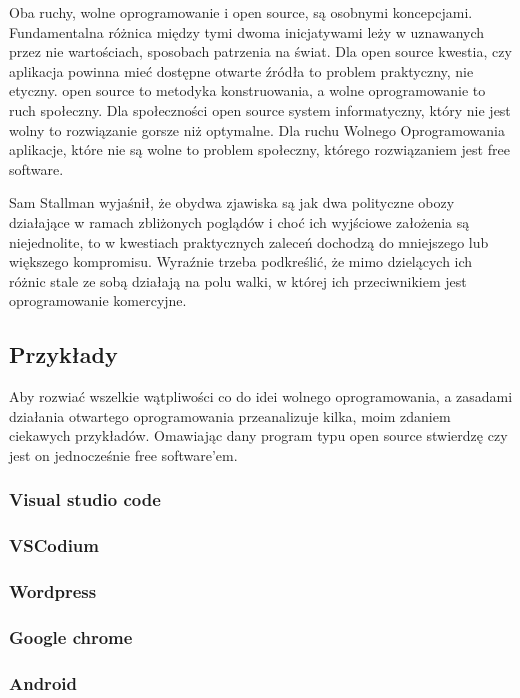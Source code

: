 \documentclass{article}
\begin{document}
Oba ruchy, wolne oprogramowanie i open source, są osobnymi koncepcjami. 
Fundamentalna różnica między tymi dwoma inicjatywami leży w uznawanych przez nie wartościach, sposobach patrzenia na świat. 
Dla open source kwestia, czy aplikacja powinna mieć dostępne otwarte źródła to problem praktyczny, nie etyczny. 
open source to metodyka konstruowania, a wolne oprogramowanie to ruch społeczny. Dla społeczności open source system informatyczny, 
który nie jest wolny to rozwiązanie gorsze niż optymalne. Dla ruchu Wolnego Oprogramowania aplikacje, które nie są wolne to problem społeczny, 
którego rozwiązaniem jest free software.

Sam Stallman wyjaśnił, że obydwa zjawiska są jak dwa polityczne obozy działające w ramach zbliżonych poglądów i choć ich wyjściowe założenia są niejednolite, to w kwestiach praktycznych zaleceń dochodzą do mniejszego lub większego kompromisu. Wyraźnie trzeba podkreślić, że mimo dzielących ich różnic stale ze sobą działają na polu walki, w której ich przeciwnikiem jest oprogramowanie komercyjne\cite{Kotula}.

\subsection{Przykłady}

Aby rozwiać wszelkie wątpliwości co do idei wolnego oprogramowania, a zasadami działania otwartego oprogramowania przeanalizuje kilka, moim zdaniem ciekawych przykładów. Omawiając dany program typu open source stwierdzę czy jest on jednocześnie free software'em.

\subsubsection{Visual studio code}

\subsubsection{VSCodium}

\subsubsection{Wordpress}

\subsubsection{Google chrome}

\subsubsection{Android}
\end{document}
